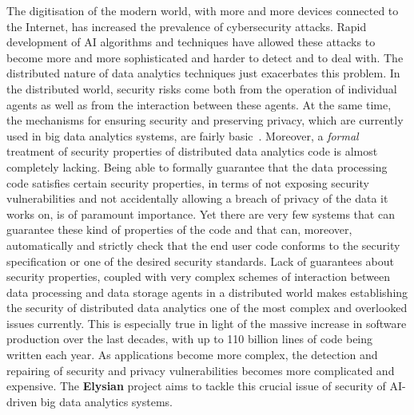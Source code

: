 \documentclass[a4paper,11pt]{article}
\newcommand{\project}[1]{\textbf{#1}\xspace}
\newcommand{\SECURITY}{\project{Elysian}}
\newcommand{\TheProject}{\SECURITY}
\begin{document}
The digitisation of the modern world, with more and more devices connected to the Internet, has increased the prevalence of cybersecurity attacks. Rapid development of AI algorithms and techniques have allowed these attacks to become more and more sophisticated and harder to detect and to deal with. The distributed nature of data analytics techniques just exacerbates this problem. In the distributed world, security risks come both from the operation of individual agents as well as from the interaction between these agents. At the same time, the mechanisms for ensuring security and preserving privacy, which are currently used in big data analytics systems, are fairly basic~\cite{basicSecurityBigData}. Moreover, a \emph{formal} treatment of security properties of distributed data analytics code is almost completely lacking. Being able to formally guarantee that the data processing code satisfies certain security properties, in terms of not exposing security vulnerabilities and not accidentally allowing a breach of privacy of the data it works on, is of paramount importance. Yet there are very few systems that can guarantee these kind of properties of the code and that can, moreover, automatically and strictly check that the end user code conforms to the security specification or one of the desired security standards. Lack of guarantees about security properties, coupled with very complex schemes of interaction between data processing and data storage agents in a distributed world makes establishing the security of distributed data analytics one of the most complex and overlooked issues currently. This is especially true in light of the massive increase in software production over the last decades, with up to 110 billion lines of code being written each year. As applications become more complex, the detection and repairing of security and privacy vulnerabilities becomes more complicated and expensive. The \TheProject{} project aims to tackle this crucial issue of security of AI-driven big data analytics systems.
\end{document}
